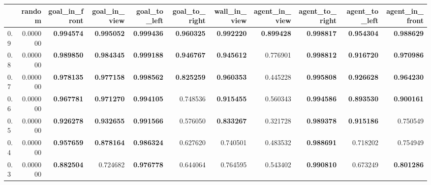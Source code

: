 \begin{tabular}{lrrrrrrrrrr}
\toprule
 & random & goal\_in\_front & goal\_in\_view & goal\_to\_left & goal\_to\_right & wall\_in\_view & agent\_in\_view & agent\_to\_right & agent\_to\_left & agent\_in\_front \\
\midrule
0.9 & 0.000000 & \color{f_darkred} \bfseries 0.994574 & \color{f_darkred} \bfseries 0.995052 & \color{f_darkred} \bfseries 0.999436 & \color{f_darkred} \bfseries 0.960325 & \color{f_darkred} \bfseries 0.992220 & \color{f_darkred} \bfseries 0.899428 & \color{f_darkred} \bfseries 0.998817 & \color{f_darkred} \bfseries 0.954304 & \color{f_darkred} \bfseries 0.988629 \\
0.8 & 0.000000 & \color{f_darkred} \bfseries 0.989850 & \color{f_darkred} \bfseries 0.984345 & \color{f_darkred} \bfseries 0.999188 & \color{f_darkred} \bfseries 0.946767 & \color{f_darkred} \bfseries 0.945612 & 0.776901 & \color{f_darkred} \bfseries 0.998812 & \color{f_darkred} \bfseries 0.916720 & \color{f_darkred} \bfseries 0.970986 \\
0.7 & 0.000000 & \color{f_darkred} \bfseries 0.978135 & \color{f_darkred} \bfseries 0.977158 & \color{f_darkred} \bfseries 0.998562 & \color{f_darkred} \bfseries 0.825259 & \color{f_darkred} \bfseries 0.960353 & 0.445228 & \color{f_darkred} \bfseries 0.995808 & \color{f_darkred} \bfseries 0.926628 & \color{f_darkred} \bfseries 0.964230 \\
0.6 & 0.000000 & \color{f_darkred} \bfseries 0.967781 & \color{f_darkred} \bfseries 0.971270 & \color{f_darkred} \bfseries 0.994105 & 0.748536 & \color{f_darkred} \bfseries 0.915455 & 0.560343 & \color{f_darkred} \bfseries 0.994586 & \color{f_darkred} \bfseries 0.893530 & \color{f_darkred} \bfseries 0.900161 \\
0.5 & 0.000000 & \color{f_darkred} \bfseries 0.926278 & \color{f_darkred} \bfseries 0.932655 & \color{f_darkred} \bfseries 0.991566 & 0.576050 & \color{f_darkred} \bfseries 0.833267 & 0.321728 & \color{f_darkred} \bfseries 0.989378 & \color{f_darkred} \bfseries 0.915186 & 0.750549 \\
0.4 & 0.000000 & \color{f_darkred} \bfseries 0.957659 & \color{f_darkred} \bfseries 0.878164 & \color{f_darkred} \bfseries 0.986324 & 0.627620 & 0.740501 & 0.483532 & \color{f_darkred} \bfseries 0.988691 & 0.718202 & 0.754949 \\
0.3 & 0.000000 & \color{f_darkred} \bfseries 0.882504 & 0.724682 & \color{f_darkred} \bfseries 0.976778 & 0.644064 & 0.764595 & 0.543402 & \color{f_darkred} \bfseries 0.990810 & 0.673249 & \color{f_darkred} \bfseries 0.801286 \\

\end{tabular}
